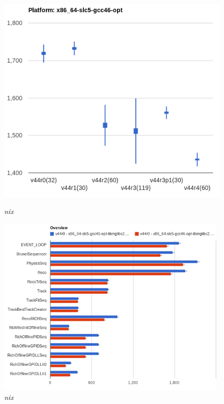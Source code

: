 \documentclass[a4paper]{jpconf}
\begin{document}
\begin{figure}[t]
\begin{minipage}[t]{17pc}
\includegraphics[scale=0.4]{figures/brunel_trend_analysis.png}
\caption{\small \textit{nix}}
\label{fig:trend}
\end{minipage}\hspace{1pc}%
\begin{minipage}[t]{17pc}
\includegraphics[scale=0.4]{figures/brunel_overview_analysis.png}
\caption{\small \textit{nix}}
\label{fig:overview}
\end{minipage}
\end{figure}
\end{document}
